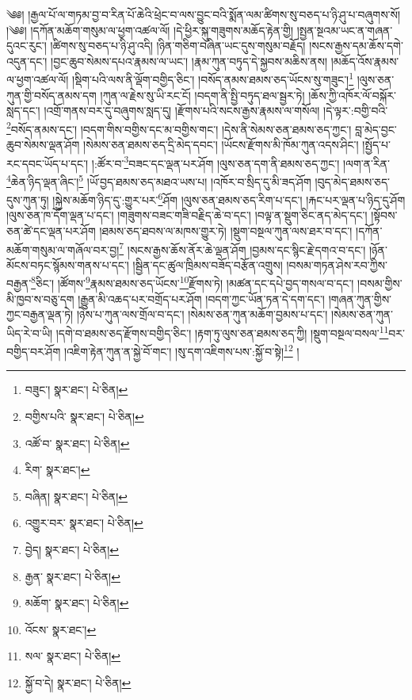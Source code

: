 \setcounter{footnote}{0} 
༄༅། །རྒྱལ་པོ་ལ་གཏམ་བྱ་བ་རིན་པོ་ཆེའི་ཕྲེང་བ་ལས་བྱུང་བའི་སྨོན་ལམ་ཚིགས་སུ་བཅད་པ་ཉི་ཤུ་པ་བཞུགས་སོ། །༄༅། །དཀོན་མཆོག་གསུམ་ལ་ཕྱག་འཚལ་ལོ། །དེ་ཕྱིར་སྐུ་གཟུགས་མཆོད་རྟེན་གྱི། །སྤྱན་སྔའམ་ཡང་ན་གཞན་དུའང་རུང་། །ཚིགས་སུ་བཅད་པ་ཉི་ཤུ་འདི། །ཉིན་གཅིག་བཞིན་ཡང་དུས་གསུམ་བརྗོད། །སངས་རྒྱས་དམ་ཆོས་དགེ་འདུན་དང་། །བྱང་ཆུབ་སེམས་དཔའ་རྣམས་ལ་ཡང་། །རྣམ་ཀུན་བཏུད་དེ་སྐྱབས་མཆིས་ནས། །མཆོད་འོས་རྣམས་ལ་ཕྱག་འཚལ་ལོ། །སྡིག་པའི་ལས་ནི་ལྡོག་བགྱིད་ཅིང་། །བསོད་ནམས་ཐམས་ཅད་ཡོངས་སུ་གཟུང་།\footnote{བཟུང་།  སྣར་ཐང་།  པེ་ཅིན། } །ལུས་ཅན་ཀུན་གྱི་བསོད་ནམས་དག །ཀུན་ལ་རྗེས་སུ་ཡི་རང་ངོ། །བདག་ནི་སྤྱི་བཏུད་ཐལ་སྦྱར་ཏེ། །ཆོས་ཀྱི་འཁོར་ལོ་བསྐོར་སླད་དང་། །འགྲོ་གནས་བར་དུ་བཞུགས་སླད་དུ། །རྫོགས་པའི་སངས་རྒྱས་རྣམས་ལ་གསོལ། །དེ་ལྟར་:བགྱི་བའི་\footnote{བགྱིས་པའི་  སྣར་ཐང་།  པེ་ཅིན། }བསོད་ནམས་དང་། །བདག་གིས་བགྱིས་དང་མ་བགྱིས་གང་། །དེས་ནི་སེམས་ཅན་ཐམས་ཅད་ཀྱང་། བླ་མེད་བྱང་ཆུབ་སེམས་ལྡན་ཤོག །སེམས་ཅན་ཐམས་ཅད་དྲི་མེད་དབང་། །ཡོངས་རྫོགས་མི་ཁོམ་ཀུན་འདས་ཤིང་། །སྤྱོད་པ་རང་དབང་ཡོད་པ་དང་། །:ཚོར་བ་\footnote{འཚོ་བ་  སྣར་ཐང་།  པེ་ཅིན། }བཟང་དང་ལྡན་པར་ཤོག །ལུས་ཅན་དག་ནི་ཐམས་ཅད་ཀྱང་། །ལག་ན་རིན་\footnote{རིག་  སྣར་ཐང་། }ཆེན་ཉིད་ལྡན་ཞིང་།\footnote{བཞིན།  སྣར་ཐང་།  པེ་ཅིན། } །ཡོ་བྱད་ཐམས་ཅད་མཐའ་ཡས་པ། །འཁོར་བ་སྲིད་དུ་མི་ཟད་ཤོག །བུད་མེད་ཐམས་ཅད་དུས་ཀུན་ཏུ། །སྐྱེས་མཆོག་ཉིད་དུ་:གྱུར་པར་\footnote{འགྱུར་བར་  སྣར་ཐང་།  པེ་ཅིན། }ཤོག །ལུས་ཅན་ཐམས་ཅད་རིག་པ་དང་། །རྐང་པར་ལྡན་པ་ཉིད་དུ་ཤོག །ལུས་ཅན་ཁ་དོག་ལྡན་པ་དང་། །གཟུགས་བཟང་གཟི་བརྗིད་ཆེ་བ་དང་། །བལྟ་ན་སྡུག་ཅིང་ནད་མེད་དང་། །སྟོབས་ཅན་ཚེ་དང་ལྡན་པར་ཤོག །ཐམས་ཅད་ཐབས་ལ་མཁས་གྱུར་ཏེ། །སྡུག་བསྔལ་ཀུན་ལས་ཐར་བ་དང་། །དཀོན་མཆོག་གསུམ་ལ་གཞོལ་བར་བྱ།\footnote{བྱེད།  སྣར་ཐང་།  པེ་ཅིན། } །སངས་རྒྱས་ཆོས་ནོར་ཆེ་ལྡན་ཤོག །བྱམས་དང་སྙིང་རྗེ་དགའ་བ་དང་། །ཉོན་མོངས་བཏང་སྙོམས་གནས་པ་དང་། །སྦྱིན་དང་ཚུལ་ཁྲིམས་བཟོད་བརྩོན་འགྲུས། །བསམ་གཏན་ཤེས་རབ་ཀྱིས་བརྒྱན་\footnote{རྒྱན་  སྣར་ཐང་།  པེ་ཅིན། }ཅིང་། །ཚོགས་\footnote{མཆོག་  སྣར་ཐང་།  པེ་ཅིན། }རྣམས་ཐམས་ཅད་ཡོངས་\footnote{འོངས་  སྣར་ཐང་། }རྫོགས་ཏེ། །མཚན་དང་དཔེ་བྱད་གསལ་བ་དང་། །བསམ་གྱིས་མི་ཁྱབ་ས་བཅུ་དག །རྒྱུན་མི་འཆད་པར་བགྲོད་པར་ཤོག །བདག་ཀྱང་ཡོན་ཏན་དེ་དག་དང་། །གཞན་ཀུན་གྱིས་ཀྱང་བརྒྱན་ལྡན་ཏེ། །ཉེས་པ་ཀུན་ལས་གྲོལ་བ་དང་། །སེམས་ཅན་ཀུན་མཆོག་བྱམས་པ་དང་། །སེམས་ཅན་ཀུན་ཡིད་རེ་བ་ཡི། །དགེ་བ་ཐམས་ཅད་རྫོགས་བགྱིད་ཅིང་། །རྟག་ཏུ་ལུས་ཅན་ཐམས་ཅད་ཀྱི། །སྡུག་བསྔལ་བསལ་\footnote{སལ་  སྣར་ཐང་།  པེ་ཅིན། }བར་བགྱིད་བར་ཤོག །འཇིག་རྟེན་ཀུན་ན་སྐྱེ་བོ་གང་། །སུ་དག་འཇིགས་པས་:སྐྱོ་བ་སྟེ།\footnote{སྐྱོ་བ་དེ།  སྣར་ཐང་།  པེ་ཅིན། } །
